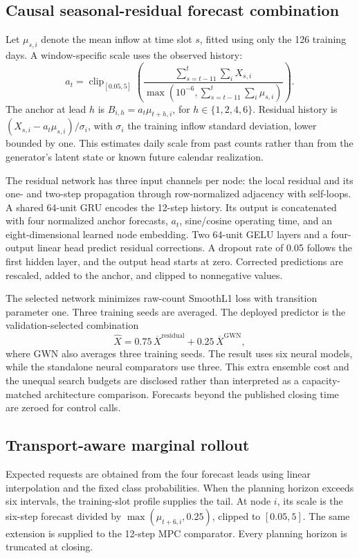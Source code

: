 \subsection{Causal seasonal-residual forecast combination}
Let $\mu_{s,i}$ denote the mean inflow at time slot $s$, fitted using only the 126 training days. A window-specific scale uses the observed history:
\begin{equation}
a_t=\operatorname{clip}_{[0.05,5]}\!\left(
\frac{\sum_{s=t-11}^{t}\sum_i X_{s,i}}
{\max(10^{-6},\sum_{s=t-11}^{t}\sum_i\mu_{s,i})}\right).
\end{equation}
The anchor at lead $h$ is $B_{i,h}=a_t\mu_{t+h,i}$, for $h\in\{1,2,4,6\}$. Residual history is $(X_{s,i}-a_t\mu_{s,i})/\sigma_i$, with $\sigma_i$ the training inflow standard deviation, lower bounded by one. This estimates daily scale from past counts rather than from the generator's latent state or known future calendar realization.

The residual network has three input channels per node: the local residual and its one- and two-step propagation through row-normalized adjacency with self-loops. A shared 64-unit GRU encodes the 12-step history. Its output is concatenated with four normalized anchor forecasts, $a_t$, sine/cosine operating time, and an eight-dimensional learned node embedding. Two 64-unit GELU layers and a four-output linear head predict residual corrections. A dropout rate of 0.05 follows the first hidden layer, and the output head starts at zero. Corrected predictions are rescaled, added to the anchor, and clipped to nonnegative values.

The selected network minimizes raw-count SmoothL1 loss with transition parameter one. Three training seeds are averaged. The deployed predictor is the validation-selected combination
\begin{equation}
\widehat X=0.75\,\overline X^{\mathrm{residual}}
           +0.25\,\overline X^{\mathrm{GWN}},
\end{equation}
where GWN also averages three training seeds. The result uses six neural models, while the standalone neural comparators use three. This extra ensemble cost and the unequal search budgets are disclosed rather than interpreted as a capacity-matched architecture comparison. Forecasts beyond the published closing time are zeroed for control calls.

\subsection{Transport-aware marginal rollout}
Expected requests are obtained from the four forecast leads using linear interpolation and the fixed class probabilities. When the planning horizon exceeds six intervals, the training-slot profile supplies the tail. At node $i$, its scale is the six-step forecast divided by $\max(\mu_{t+6,i},0.25)$, clipped to $[0.05,5]$. The same extension is supplied to the 12-step MPC comparator. Every planning horizon is truncated at closing.

